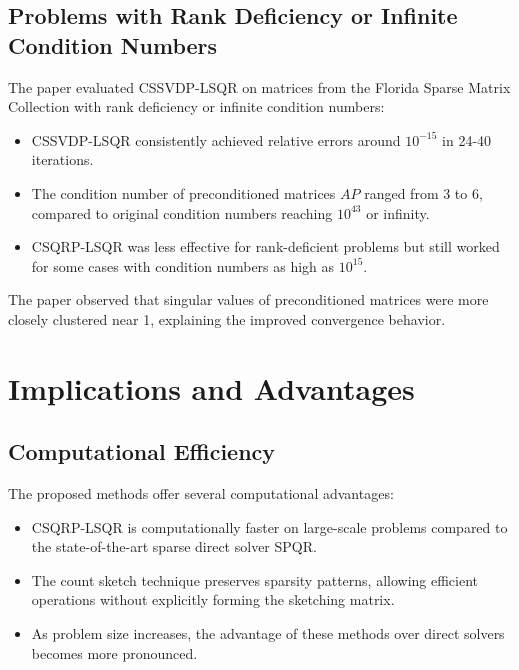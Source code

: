 \documentclass[11pt]{article}
\begin{document}
\subsection{Problems with Rank Deficiency or Infinite Condition Numbers}

The paper evaluated CSSVDP-LSQR on matrices from the Florida Sparse Matrix Collection with rank deficiency or infinite condition numbers:

\begin{itemize}
    \item CSSVDP-LSQR consistently achieved relative errors around $10^{-15}$ in 24-40 iterations.
    
    \item The condition number of preconditioned matrices $AP$ ranged from 3 to 6, compared to original condition numbers reaching $10^{43}$ or infinity.
    
    \item CSQRP-LSQR was less effective for rank-deficient problems but still worked for some cases with condition numbers as high as $10^{15}$.
\end{itemize}

The paper observed that singular values of preconditioned matrices were more closely clustered near 1, explaining the improved convergence behavior.

\section{Implications and Advantages}

\subsection{Computational Efficiency}

The proposed methods offer several computational advantages:

\begin{itemize}
    \item CSQRP-LSQR is computationally faster on large-scale problems compared to the state-of-the-art sparse direct solver SPQR.
    
    \item The count sketch technique preserves sparsity patterns, allowing efficient operations without explicitly forming the sketching matrix.
    
    \item As problem size increases, the advantage of these methods over direct solvers becomes more pronounced.
\end{itemize}
\end{document}
